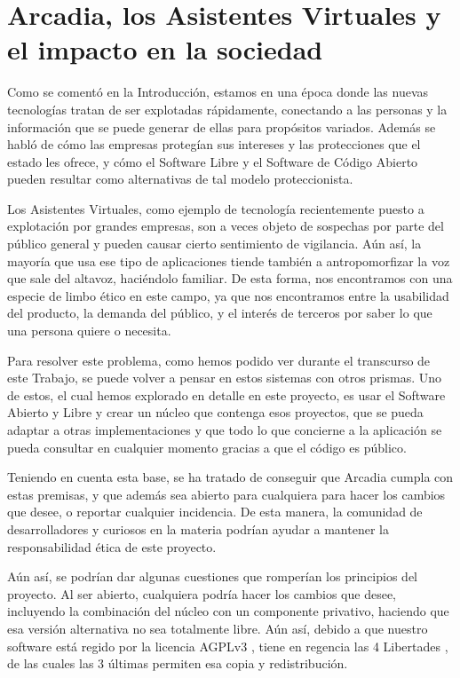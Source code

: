 \section{Arcadia, los Asistentes Virtuales y el impacto en la sociedad}
Como se comentó en la Introducción, estamos en una época donde las nuevas tecnologías tratan de ser explotadas rápidamente, conectando a las personas y la información que se puede generar de ellas para propósitos variados. Además se habló de cómo las empresas protegían sus intereses y las protecciones que el estado les ofrece, y cómo el Software Libre y el Software de Código Abierto pueden resultar como alternativas de tal modelo proteccionista.

Los Asistentes Virtuales, como ejemplo de tecnología recientemente puesto a explotación por grandes empresas, son a veces objeto de sospechas por parte del público general y pueden causar cierto sentimiento de vigilancia. Aún así, la mayoría que usa ese tipo de aplicaciones tiende también a antropomorfizar la voz \cite{va-antromorfismos} que sale del altavoz, haciéndolo familiar. De esta forma, nos encontramos con una especie de limbo ético en este campo, ya que nos encontramos entre la usabilidad del producto, la demanda del público, y el interés de terceros por saber lo que una persona quiere o necesita.

Para resolver este problema, como hemos podido ver durante el transcurso de este Trabajo, se puede volver a pensar en estos sistemas con otros prismas. Uno de estos, el cual hemos explorado en detalle en este proyecto, es usar el Software Abierto y Libre y crear un núcleo que contenga esos proyectos, que se pueda adaptar a otras implementaciones y que todo lo que concierne a la aplicación se pueda consultar en cualquier momento gracias a que el código es público.

Teniendo en cuenta esta base, se ha tratado de conseguir que Arcadia cumpla con estas premisas, y que además sea abierto para cualquiera para hacer los cambios que desee, o reportar cualquier incidencia. De esta manera, la comunidad de desarrolladores y curiosos en la materia podrían ayudar a mantener la responsabilidad ética de este proyecto.

Aún así, se podrían dar algunas cuestiones que romperían los principios del proyecto. Al ser abierto, cualquiera podría hacer los cambios que desee, incluyendo la combinación del núcleo con un componente privativo, haciendo que esa versión alternativa no sea totalmente libre. Aún así, debido a que nuestro software está regido por la licencia AGPLv3 \cite{gplv3}, tiene en regencia las 4 Libertades \cite{fsf-philosophy}, de las cuales las 3 últimas permiten esa copia y redistribución.

